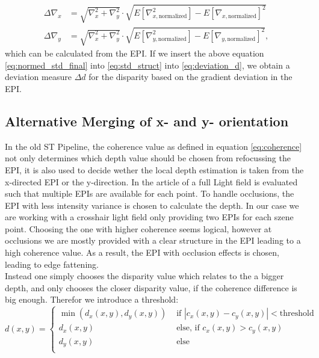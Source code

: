 \documentclass  [
  paper    = a4,
  BCOR     = 10mm,
  twoside,
  fontsize = 12pt,
  fleqn,
  toc      = bibnumbered,
  toc      = listofnumbered,
  numbers  = noendperiod,
  headings = normal,
  listof   = leveldown,
  version  = 3.03
]                                       {scrreprt}
\begin{document}
 \begin{align}\label{eq:normed_std_final}
 \Delta\nabla_{x} &=  \sqrt{\nabla_x^2 + \nabla_y^2} \cdot \sqrt{E[\nabla_{x, \text{normalized}}^2] - E[\nabla_{x, \text{normalized}}]^2}\\
 \Delta\nabla_{y} &= \sqrt{\nabla_x^2 + \nabla_y^2} \cdot \sqrt{E[\nabla_{y, \text{normalized}}^2] - E[\nabla_{y, \text{normalized}}]^2},
 \end{align}
 which can be calculated from the EPI.
 If we insert the above equation \ref{eq:normed_std_final} into \ref{eq:std_struct} into \ref{eq:deviation_d}, we obtain a deviation measure $\Delta d$ for the disparity based on the gradient deviation in the EPI.
 
 \subsection{Alternative Merging of x- and y- orientation}
 In the old ST Pipeline, the coherence value as defined in equation \ref{eq:coherence} not only determines which depth value should be chosen from refocussing the EPI, it is also used to decide wether the local depth estimation is taken from the x-directed EPI or the y-direction. In the article of \cite{sheng2018occlusion} a full Light field is evaluated such that multiple EPIs are available for each point. To handle occlusions, the EPI with less intensity variance is chosen to calculate the depth. In our case we are working with a crosshair light field only providing two EPIs for each szene point. Choosing the one with higher coherence seems logical, however at occlusions we are mostly provided with a clear structure in the EPI leading to a high coherence value. As a result, the EPI with occlusion effects is chosen, leading to edge fattening.\\
 Instead one simply chooses the disparity value which relates to the a bigger depth, and only chooses the closer disparity value, if the coherence difference is big enough. Therefor we introduce a threshold:
 \begin{equation}\label{eq:altmerging}
 d(x,y) = \begin{cases}
 \min(d_x(x,y),d_y(x,y))&\text{ if } |c_x(x,y)-c_y(x,y)|<\text{threshold} \\
  d_x(x,y)&\text{ else, if } c_x(x,y)> c_y(x,y)\\
  d_y(x,y)&\text{ else}\\
  \end{cases}
   \end{equation}
\end{document}
